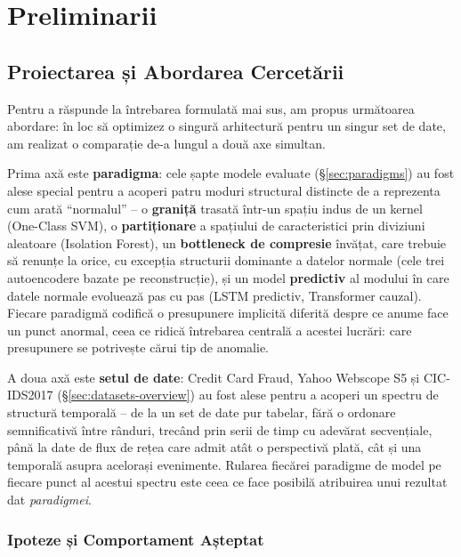 \chapter{Preliminarii}
\label{ch:preliminarii}

\section{Proiectarea și Abordarea Cercetării}
\label{sec:two-axes}

Pentru a răspunde la întrebarea formulată mai sus, am propus următoarea abordare: în loc să optimizez o singură arhitectură pentru un singur set de date, am realizat o comparație de-a lungul a două axe simultan.

Prima axă este \textbf{paradigma}: cele șapte modele evaluate (\S\ref{sec:paradigms}) au fost alese special pentru a acoperi patru moduri structural distincte de a reprezenta cum arată \enquote{normalul} -- o \textbf{graniță} trasată într-un spațiu indus de un kernel (One-Class SVM), o \textbf{partiționare} a spațiului de caracteristici prin diviziuni aleatoare (Isolation Forest), un \textbf{bottleneck de compresie} învățat, care trebuie să renunțe la orice, cu excepția structurii dominante a datelor normale (cele trei autoencodere bazate pe reconstrucție), și un model \textbf{predictiv} al modului în care datele normale evoluează pas cu pas (LSTM predictiv, Transformer cauzal). Fiecare paradigmă codifică o presupunere implicită diferită despre ce anume face un punct anormal, ceea ce ridică întrebarea centrală a acestei lucrări: care presupunere se potrivește cărui tip de anomalie.

A doua axă este \textbf{setul de date}: Credit Card Fraud, Yahoo Webscope S5 și CIC-IDS2017 (\S\ref{sec:datasets-overview}) au fost alese pentru a acoperi un spectru de structură temporală -- de la un set de date pur tabelar, fără o ordonare semnificativă între rânduri, trecând prin serii de timp cu adevărat secvențiale, până la date de flux de rețea care admit atât o perspectivă plată, cât și una temporală asupra acelorași evenimente. Rularea fiecărei paradigme de model pe fiecare punct al acestui spectru este ceea ce face posibilă atribuirea unui rezultat dat \emph{paradigmei}.

\subsection{Ipoteze și Comportament Așteptat}
\label{sec:expected-behaviour}

